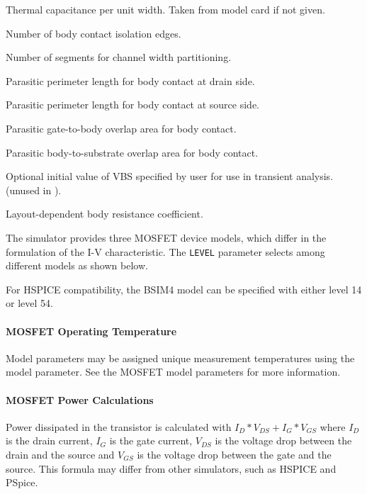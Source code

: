 \begin{Device}
\begin{Parameters}
Thermal capacitance per unit width.  Taken from model card if not given.

Number of body contact isolation edges.

Number of segments for channel width partitioning.

Parasitic perimeter length for body contact at drain side.

Parasitic perimeter length for body contact at source side.

Parasitic gate-to-body overlap area for body contact.

Parasitic body-to-substrate overlap area for body contact.

Optional initial value of VBS specified by user for use in transient
analysis.  (unused in \Xyce{}).

Layout-dependent body resistance coefficient.

\end{Parameters}

\comments

The simulator provides three MOSFET device models, which differ in the
formulation of the I-V characteristic. The \texttt{LEVEL} parameter
selects among different models as shown below.

For HSPICE compatibility, the BSIM4 model can be specified with either
level 14 or level 54.

\end{Device}

\paragraph{MOSFET Operating Temperature}
Model parameters may be assigned unique measurement temperatures using the
 model parameter. See the MOSFET model parameters for more
information.

\paragraph{MOSFET Power Calculations}
Power dissipated in the transistor is calculated with $I_{D}*V_{DS}+I_{G}*V_{GS}$ where
$I_{D}$ is the drain current, $I_{G}$ is the gate current, $V_{DS}$ is the
voltage drop between the drain and the source and $V_{GS}$ is the voltage drop
between the gate and the source. This formula may differ from other simulators,
such as HSPICE and PSpice.


